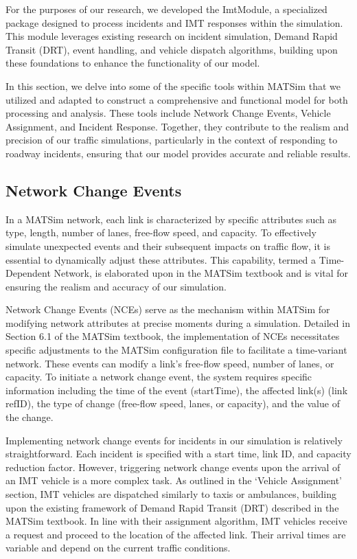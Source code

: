 \documentclass[fancy, oneside, mastersfancy, ms]{byuthesis}
\begin{document}
For the purposes of our research, we developed the ImtModule, a
specialized package designed to process incidents and IMT responses
within the simulation. This module leverages existing research on
incident simulation, Demand Rapid Transit (DRT), event handling, and
vehicle dispatch algorithms, building upon these foundations to enhance
the functionality of our model.

In this section, we delve into some of the specific tools within MATSim
that we utilized and adapted to construct a comprehensive and functional
model for both processing and analysis. These tools include Network
Change Events, Vehicle Assignment, and Incident Response. Together, they
contribute to the realism and precision of our traffic simulations,
particularly in the context of responding to roadway incidents, ensuring
that our model provides accurate and reliable results.

\hypertarget{network-change-events}{%
\subsection{Network Change Events}\label{network-change-events}}

In a MATSim network, each link is characterized by specific attributes
such as type, length, number of lanes, free-flow speed, and capacity. To
effectively simulate unexpected events and their subsequent impacts on
traffic flow, it is essential to dynamically adjust these attributes.
This capability, termed a Time-Dependent Network, is elaborated upon in
the MATSim textbook and is vital for ensuring the realism and accuracy
of our simulation.

Network Change Events (NCEs) serve as the mechanism within MATSim for
modifying network attributes at precise moments during a simulation.
Detailed in Section 6.1 of the MATSim textbook, the implementation of
NCEs necessitates specific adjustments to the MATSim configuration file
to facilitate a time-variant network. These events can modify a link's
free-flow speed, number of lanes, or capacity. To initiate a network
change event, the system requires specific information including the
time of the event (startTime), the affected link(s) (link refID), the
type of change (free-flow speed, lanes, or capacity), and the value of
the change.

Implementing network change events for incidents in our simulation is
relatively straightforward. Each incident is specified with a start
time, link ID, and capacity reduction factor. However, triggering
network change events upon the arrival of an IMT vehicle is a more
complex task. As outlined in the `Vehicle Assignment' section, IMT
vehicles are dispatched similarly to taxis or ambulances, building upon
the existing framework of Demand Rapid Transit (DRT) described in the
MATSim textbook. In line with their assignment algorithm, IMT vehicles
receive a request and proceed to the location of the affected link.
Their arrival times are variable and depend on the current traffic
conditions.
\end{document}
